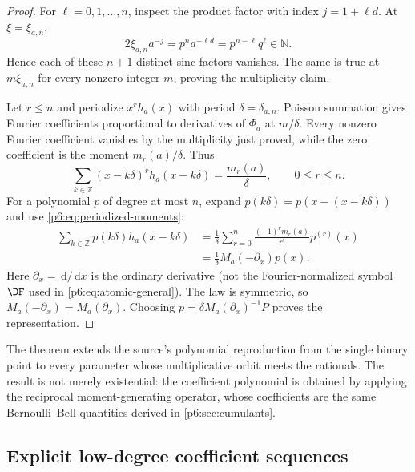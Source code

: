 \documentclass[11pt,oneside]{article}
\numberwithin{equation}{section}
\theoremstyle{definition}
\theoremstyle{remark}
\newcommand{\N}{\mathbb N}
\newcommand{\Z}{\mathbb Z}
\newcommand{\dd}{\,\mathrm d}
\begin{document}
\begin{proof}
For $\ell=0,1,\ldots,n$, inspect the product factor with index
$j=1+\ell d$.  At $\xi=\xi_{a,n}$,
\[
 2\xi_{a,n}a^{-j}
 =p^na^{-\ell d}
 =p^{n-\ell}q^\ell\in\N.
\]
Hence each of these $n+1$ distinct sinc factors vanishes.  The same is true at
$m\xi_{a,n}$ for every nonzero integer $m$, proving the multiplicity claim.

Let $r\le n$ and periodize $x^rh_a(x)$ with period $\delta=\delta_{a,n}$.
Poisson summation gives Fourier coefficients proportional to derivatives of
$\Phi_a$ at $m/\delta$.  Every nonzero Fourier coefficient vanishes by the
multiplicity just proved, while the zero coefficient is the moment
$m_r(a)/\delta$.  Thus
\begin{equation}\label{p6:eq:periodized-moments}
 \sum_{k\in\Z}(x-k\delta)^r h_a(x-k\delta)
 =\frac{m_r(a)}{\delta},
 \qquad 0\le r\le n.
\end{equation}
For a polynomial $p$ of degree at most $n$, expand
$p(k\delta)=p(x-(x-k\delta))$ and use
\eqref{p6:eq:periodized-moments}:
\begin{align*}
 \sum_{k\in\Z}p(k\delta)h_a(x-k\delta)
 &=\frac1\delta
 \sum_{r=0}^{n}\frac{(-1)^rm_r(a)}{r!}p^{(r)}(x)\\
 &=\frac1\delta M_a(-\partial_x)p(x).
\end{align*}
Here $\partial_x=\dd/\dd x$ is the ordinary derivative (not the
Fourier-normalized symbol $\DF$ used in \cref{p6:eq:atomic-general}).  The law is
symmetric, so $M_a(-\partial_x)=M_a(\partial_x)$.  Choosing
$p=\delta M_a(\partial_x)^{-1}P$ proves the representation.
\end{proof}

\begin{novelbox}
The theorem extends the source's polynomial reproduction from the single binary
point to every parameter whose multiplicative orbit meets the rationals.  The
result is not merely existential: the coefficient polynomial is obtained by
applying the reciprocal moment-generating operator, whose coefficients are the
same Bernoulli--Bell quantities derived in \cref{p6:sec:cumulants}.
\end{novelbox}

\subsection{Explicit low-degree coefficient sequences}
\end{document}
